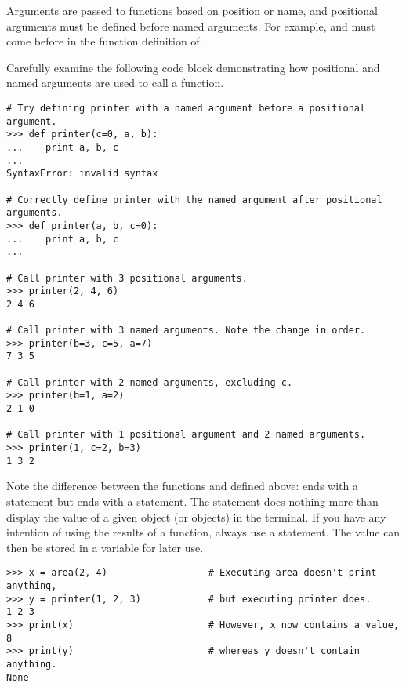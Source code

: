 Arguments are passed to functions based on position or name, and positional arguments must be defined before named arguments.
For example,  and  must come before  in the function definition of .

Carefully examine the following code block demonstrating how positional and named arguments are used to call a function.
\begin{lstlisting}
# Try defining printer with a named argument before a positional argument.
>>> def printer(c=0, a, b):
...    print a, b, c
...
SyntaxError: invalid syntax

# Correctly define printer with the named argument after positional arguments.
>>> def printer(a, b, c=0):
...    print a, b, c
...

# Call printer with 3 positional arguments.
>>> printer(2, 4, 6)
2 4 6

# Call printer with 3 named arguments. Note the change in order.
>>> printer(b=3, c=5, a=7)
7 3 5

# Call printer with 2 named arguments, excluding c.
>>> printer(b=1, a=2)
2 1 0

# Call printer with 1 positional argument and 2 named arguments.
>>> printer(1, c=2, b=3)
1 3 2
\end{lstlisting}

Note the difference between the functions  and  defined above:  ends with a  statement but  ends with a  statement.
The  statement does nothing more than display the value of a given object (or objects) in the terminal.
If you have any intention of using the results of a function, always use a  statement.
The value can then be stored in a variable for later use.

\begin{lstlisting}
>>> x = area(2, 4)                  # Executing area doesn't print anything,
>>> y = printer(1, 2, 3)            # but executing printer does.
1 2 3
>>> print(x)                        # However, x now contains a value,
8
>>> print(y)                        # whereas y doesn't contain anything.
None
\end{lstlisting}

\begin{comment}   %
The most general form of a function definition is as follows.
\begin{lstlisting}
def fn(*args, **kwargs):
\end{lstlisting}
This means that ``\li{fn} accepts arguments and keyword arguments.''
The arguments, \li{args}, are stored as a tuple; the keyword arguments, \li{kwargs}, are stored as a dictionary.
Such functions can accept any number of arguments and keyword arguments.
\begin{lstlisting}
>>> def fn(*args, **kwargs):
...     print "Positional: ", args
...     print "Keyword: ", kwargs
...     
>>> fn("Hello", 2, 1, apples = 3, oranges = 2)
<<Positional: ('Hello', 2, 1)
Keyword: {'apples': 3, 'oranges': 2}>>
\end{lstlisting}
\end{comment}

